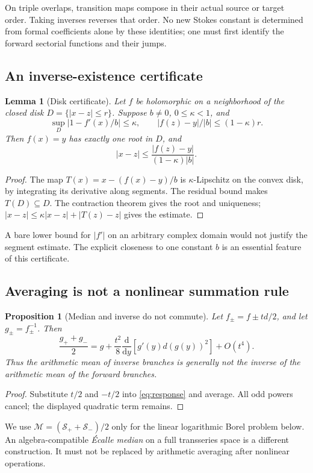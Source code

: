 \documentclass[11pt,a4paper]{article}
\numberwithin{equation}{section}
\newtheorem{proposition}[theorem]{Proposition}
\newtheorem{lemma}[theorem]{Lemma}
\theoremstyle{definition}
\theoremstyle{remark}\newtheorem{remark}[theorem]{Remark}
\newcommand{\Sp}{\mathcal S_{+}}\newcommand{\Sm}{\mathcal S_{-}}
\newcommand{\Med}{\mathcal M}\newcommand{\eps}{\varepsilon}
\begin{document}
On triple overlaps, transition maps compose in their actual source or
target order. Taking inverses reverses that order. No new Stokes constant
is determined from formal coefficients alone by these identities; one
must first identify the forward sectorial functions and their jumps.

\subsection{An inverse-existence certificate}
\begin{lemma}[Disk certificate]\label{lem:certificate}
Let $f$ be holomorphic on a neighborhood of the closed disk
$D=\{|x-z|\le r\}$. Suppose $b\ne0$, $0\le\kappa<1$, and
\[
 \sup_D|1-f'(x)/b|\le\kappa,\qquad
 |f(z)-y|/|b|\le(1-\kappa)r.
\]
Then $f(x)=y$ has exactly one root in $D$, and
\begin{equation}\label{eq:certificate}
 |x-z|\le\frac{|f(z)-y|}{(1-\kappa)|b|}.
\end{equation}
\end{lemma}
\begin{proof}
The map $T(x)=x-(f(x)-y)/b$ is $\kappa$-Lipschitz on the convex disk,
by integrating its derivative along segments. The residual bound makes
$T(D)\subseteq D$. The contraction theorem gives the root and uniqueness;
$|x-z|\le\kappa|x-z|+|T(z)-z|$ gives the estimate.
\end{proof}
A bare lower bound for $|f'|$ on an arbitrary complex domain would not
justify the segment estimate. The explicit closeness to one constant
$b$ is an essential feature of this certificate.

\subsection{Averaging is not a nonlinear summation rule}
\begin{proposition}[Median and inverse do not commute]\label{prop:median}
Let $f_\pm=f\pm td/2$, and let $g_\pm=f_\pm^{-1}$. Then
\begin{equation}\label{eq:median-failure}
 \frac{g_++g_-}{2}=g+\frac{t^2}{8}
 \frac{\mathrm d}{\mathrm dy}\left[g'(y)d(g(y))^2\right]+O(t^4).
\end{equation}
Thus the arithmetic mean of inverse branches is generally not the
inverse of the arithmetic mean of the forward branches.
\end{proposition}
\begin{proof}
Substitute $t/2$ and $-t/2$ into \eqref{eq:response} and average. All
odd powers cancel; the displayed quadratic term remains.
\end{proof}
We use $\Med=(\Sp+\Sm)/2$ only for the linear logarithmic Borel problem
below. An algebra-compatible \emph{\'Ecalle median} on a full transseries
space is a different construction. It must not be replaced by arithmetic
averaging after nonlinear operations.
\end{document}
